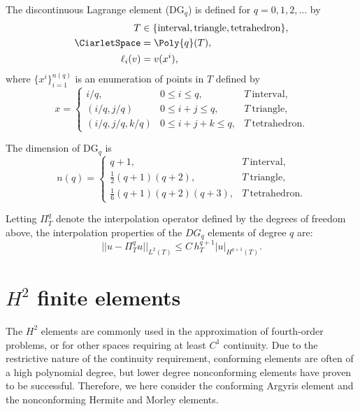 \begin{definition}
  The discontinuous Lagrange element ($\mathrm{DG}_q$)
  is defined for $q = 0, 1, 2, \dots$ by
  \begin{align}
    T &\in \{ \mathrm{interval}{},
              \mathrm{triangle}{},
              \mathrm{tetrahedron}{}\}, \\
    \CiarletSpace &= \Poly{q}(T), \\
    \ell_i(v) &= v(x^i),
  \end{align}
  where $\{ x^i \}_{i=1}^{n(q)}$ is an enumeration of points in
  $T$ defined by
  \begin{equation}
    x =
    \left \{
    \begin{array}{lll}
      i/q,            & 0 \leqslant i \leqslant q,         & T~\mathrm{interval}, \\
      (i/q, j/q)      & 0 \leqslant i + j \leqslant q,     & T~\mathrm{triangle}, \\
      (i/q, j/q, k/q) & 0 \leqslant i + j + k \leqslant q, & T~\mathrm{tetrahedron}.
    \end{array}
    \right.
  \end{equation}
\end{definition}
The dimension of $\mathrm{DG}_q$ is
\begin{equation}
  n(q) =
    \left \{
    \begin{array}{ll}
      q + 1, & T~\mathrm{interval}, \\
      \frac{1}{2} (q + 1)(q + 2), & T~\mathrm{triangle}, \\
      \frac{1}{6} (q + 1)(q + 2)(q + 3), & T~\mathrm{tetrahedron}.
    \end{array}
    \right.
\end{equation}


Letting $\Pi_T^q$ denote the interpolation operator defined by the
degrees of freedom above, the interpolation properties of the $DG_q$
elements of degree $q$ are:
\begin{equation}
  ||u - \Pi_T^q u||_{L^2(T)} \leqslant C \, h_T^{q + 1} |u|_{H^{q+1}(T)}.
\end{equation}

\section{$H^2$ finite elements}

The $H^2$ elements are commonly used in the approximation of
fourth-order problems, or for other spaces requiring at least $C^1$
continuity.  Due to the restrictive nature of the continuity
requirement, conforming elements are often of a high polynomial
degree, but lower degree nonconforming elements have proven to be
successful. Therefore, we here consider the conforming Argyris element
and the nonconforming Hermite and Morley elements.


